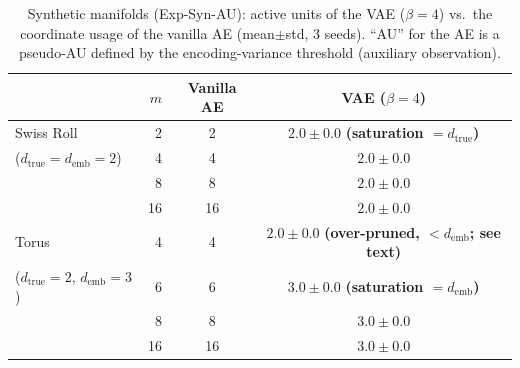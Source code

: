 \documentclass[make,article,submit,pdftex,moreauthors]{Definitions/mdpi}
\newcommand{\dtrue}{d_{\mathrm{true}}}
\newcommand{\demb}{d_{\mathrm{emb}}}
\begin{document}
\begin{table}[H]
\caption{Synthetic manifolds (Exp-Syn-AU): active units of the VAE
($\beta = 4$) vs.\ the coordinate usage of the vanilla AE (mean$\pm$std,
3 seeds). ``AU'' for the AE is a pseudo-AU defined by the encoding-variance
threshold (auxiliary observation).}
\label{tab:ea}
\small
\begin{tabular}{lrcc}
\toprule
 & $m$ & \textbf{Vanilla AE} & \textbf{VAE ($\beta = 4$)} \\
\midrule
Swiss Roll & 2 & 2 & $2.0 \pm 0.0$ \textbf{(saturation $= \dtrue$)} \\
($\dtrue = \demb = 2$) & 4 & 4 & $2.0 \pm 0.0$ \\
 & 8 & 8 & $2.0 \pm 0.0$ \\
 & 16 & 16 & $2.0 \pm 0.0$ \\
\midrule
Torus & 4 & 4 & $2.0 \pm 0.0$ \textbf{(over-pruned, $< \demb$; see text)} \\
($\dtrue = 2$, $\demb = 3$) & 6 & 6 & $3.0 \pm 0.0$ \textbf{(saturation $= \demb$)} \\
 & 8 & 8 & $3.0 \pm 0.0$ \\
 & 16 & 16 & $3.0 \pm 0.0$ \\
\bottomrule
\end{tabular}
\end{table}
\end{document}
